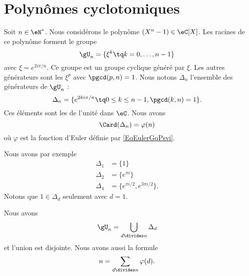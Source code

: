\section{Polynômes cyclotomiques}

Soit \( n\in \eN^*\). Nous considérons le polynôme \( (X^n-1)\in\eC[X]\). Les racines de ce polynôme forment le groupe
\begin{equation}
    \gU_n=\{ \xi^k\tq k=0,\ldots, n-1 \}
\end{equation}
avec \( \xi= e^{2i\pi/n}\). Ce groupe est un groupe cyclique généré par \( \xi\). Les autres générateurs sont les \( \xi^p\) avec \( \pgcd(p,n)=1\). Nous notons \( \Delta_n\) l'ensemble des générateurs de \( \gU_n\) :
\begin{equation}
    \Delta_n=\{  e^{2ki\pi/n}\tq 0\leq k\leq n-1,\pgcd(k,n)=1 \}.
\end{equation}
Ces éléments sont les  de l'unité dans \( \eC\). Nous avons 
\begin{equation}
    \Card(\Delta_n)=\varphi(n)
\end{equation}
où \( \varphi\) est la fonction d'Euler définie par \eqref{EqEulerGqPsvi}.

Nous avons par exemple
\begin{subequations}
    \begin{align}
        \Delta_1&=\{ 1 \}\\
        \Delta_2&=\{  e^{\pi i} \}\\
        \Delta_4&=\{  e^{\pi i/2}, e^{3\pi i/2} \}.
    \end{align}
\end{subequations}
Notons que \( 1\in \Delta_d\) seulement avec \( d=1\).

\begin{lemma}       \label{LemKcpjee}
    Nous avons
    \begin{equation}        \label{EqpZuIyL}
        \gU_n=\bigcup_{d\divides n}\Delta_d
    \end{equation}
    et l'union est disjointe. Nous avons aussi la formule
    \begin{equation}        \label{EqTPHqgJ}
        n=\sum_{d\divides n}\varphi(d).
    \end{equation}
\end{lemma}

